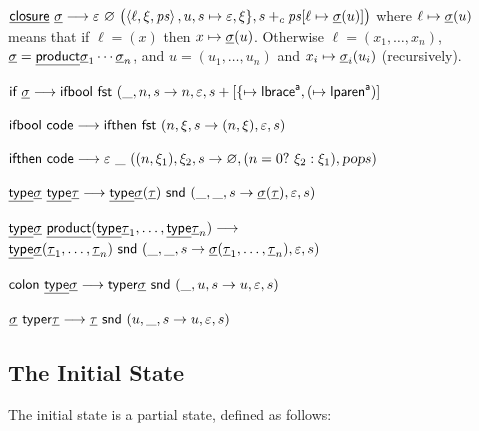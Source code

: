 \documentclass{llncs}
\begin{document}
\blist
    \item $\closure\ \tsig \longto \epsilon\ \varnothing\ \bigl(\gen{\ell,\xi,{\it ps}},u,s\mapsto\epsilon,\xi\},s+_c{\it ps}[\ell\mapsto\tsig(u)]\bigr)$ where $\ell\mapsto{\underline{\mathsf{\sigma}}}(u)$ means that if
        $\ell=(x)$ then $x\mapsto {\underline{\mathsf{\sigma}}}(u)$.
        Otherwise $\ell=(x_1,\dots,x_n)$, ${\underline{\mathsf{\sigma}}}=\underline{\mathsf{product}}{\underline{\mathsf{\sigma}}}_1\cdots{\underline{\mathsf{\sigma}}}_n$, and $u=(u_1,\dots,u_n)$ and $x_i\mapsto{\underline{\mathsf{\sigma}}}_i(u_i)$ (recursively).
\elist

\blist
    \item $\iif\ \tsig \longto \ifbool\ \fst\ (\_,n,s\to n,\epsilon,s+[\{\mapsto\Lbrace\a,(\mapsto\lparen\a)]$
    \item $\ifbool\ \code \longto \ifthen\ \fst\ (n,\xi,s\to(n,\xi),\epsilon,s)$
    \item $\ifthen\ \code \longto \epsilon\ \_\ ((n,\xi_1),\xi_2,s\to\varnothing,(n=0?\ \xi_2:\xi_1),\pop s)$
\elist

\blist
    \item $\underline{\mathsf{type}}{\underline{\mathsf{\sigma}}}\ \underline{\mathsf{type}}{\underline{\mathsf{\tau}}} \longrightarrow \underline{\mathsf{type}}{\underline{\mathsf{\sigma}}}({\underline{\mathsf{\tau}}})\ \mathsf{snd}\ (\_,\_,s\to {\underline{\mathsf{\sigma}}}({\underline{\mathsf{\tau}}}),\varepsilon,s)$
    \item $\tp\tsig\ \product(\tp\ttau_1,\dots,\tp\ttau_n) \longto$\hfil\break\null\hfill$\underline{\mathsf{type}}{\underline{\mathsf{\sigma}}}({\underline{\mathsf{\tau}}}_1,\dots,{\underline{\mathsf{\tau}}}_n)\ \mathsf{snd}\ (\_,\_,s\to {\underline{\mathsf{\sigma}}}({\underline{\mathsf{\tau}}}_1,\dots,{\underline{\mathsf{\tau}}}_n),\varepsilon,s)$
    \item $\ccolon\ \tp\tsig \longto \typer\tsig\ \snd\ (\_,u,s\to u,\epsilon,s)$
    \item $\tsig\ \typer\ttau \longto \ttau\ \snd\ (u,\_,s\to u,\epsilon,s)$
\elist

\subsection{The Initial State}

The initial state is a partial state, defined as follows:

\bigskip
\end{document}
